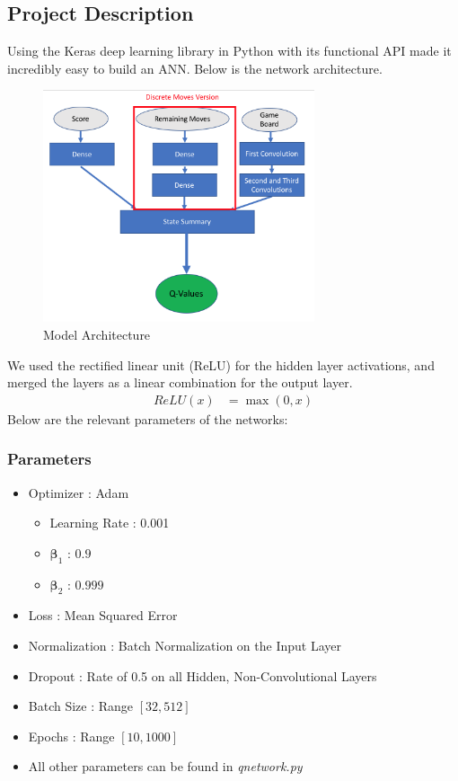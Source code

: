 \documentclass[letterpaper]{article}
\begin{document}
\subsection{Project Description}
\par
Using the Keras %
deep learning library in Python with its functional API made it incredibly easy to build an ANN. Below is the network architecture.
\begin{figure}[H]
	\centering 
	\includegraphics[width=8cm]{modelarch.png} 
	\caption{Model Architecture}
\end{figure}
\par
We used the rectified linear unit (ReLU) for the hidden layer activations, and merged the layers as a linear combination for the output layer.
 \begin{align}
	ReLU(x) &= \max(0, x) 
\end{align}
Below are the relevant parameters of the networks: 
\subsubsection{Parameters}
\begin{itemize}
	\item
	Optimizer : Adam \cite{adam}
	\begin{itemize}
		\item
		Learning Rate : 0.001
		\item
		$\boldsymbol\beta_1$ : $0.9$
		\item
		$\boldsymbol\beta_2$ : $0.999$
	\end{itemize}
	\item
	Loss : Mean Squared Error
	\item
	Normalization : Batch Normalization on the Input Layer
	\item
	Dropout : Rate of 0.5 on all Hidden, Non-Convolutional Layers
	\item
	Batch Size : Range $[32, 512]$
	\item
	Epochs : Range $[10, 1000]$
	\item
	All other parameters can be found in \emph{qnetwork.py}
\end{itemize}
\end{document}
